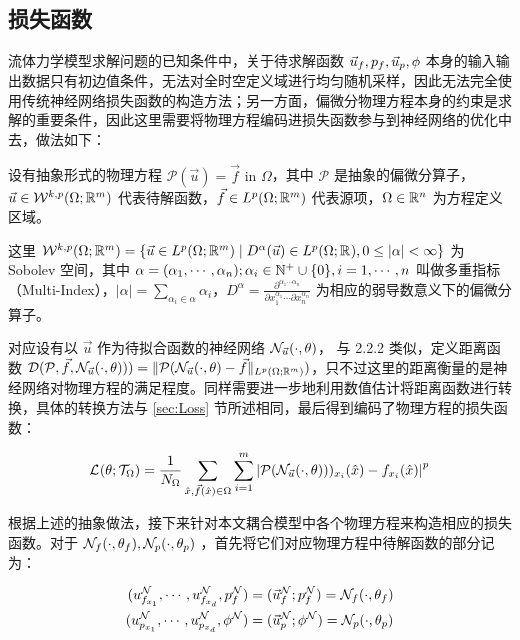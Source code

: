 \subsection{损失函数}

流体力学模型求解问题的已知条件中，关于待求解函数 $\Uf,\pf,\Up,\pp$ 本身的输入输出数据只有初边值条件，无法对全时空定义域进行均匀随机采样，因此无法完全使用传统神经网络损失函数的构造方法；另一方面，偏微分物理方程本身的约束是求解的重要条件，因此这里需要将物理方程编码进损失函数参与到神经网络的优化中去，做法如下：

设有抽象形式的物理方程 $\mathcal{P}(\vec{u}) = \vec{f} \textrm{ in } \Omega$，其中 $\mathcal{P}$ 是抽象的偏微分算子，$\vec{u} \in \Wkp{k}(\Omega; \R[m])$ 代表待解函数，$\vec{f} \in \Lp( \Omega; \R[m])$ 代表源项，$ \Omega \in \R[n]$ 为方程定义区域。

这里 $\Wkp{k}(\Omega; \R[m]) = \left\{ \vec{u} \in \Lp(\Omega;\R[m]) \mid D^\alpha(\vec{u}) \in \Lp(\Omega;\R), 0 \le |\alpha| < \infty \right\}$ 为 Sobolev 空间，其中 $\alpha = (\alpha_1,\cdots,\alpha_n); \alpha_i \in \N[+] \cup \{0\},i=1,\cdots,n$ 叫做多重指标（Multi-Index），$|\alpha| = \sum_{\alpha_i \in \alpha} \alpha_i$，$D^\alpha = \frac{\partial^{\alpha_1\cdots\alpha_n}}{\partial x_1^{\alpha_1}\cdots\partial x_n^{\alpha_n}}$ 为相应的弱导数意义下的偏微分算子。

对应设有以 $\vec{u}$ 作为待拟合函数的神经网络 $\NN_{\vec{u}}(\cdot,\params)$， 与 2.2.2 类似，定义距离函数 $\mathcal{D}(\mathcal{P},\vec{f},\NN_{\vec{u}}(\cdot,\params))) = \| \mathcal{P}(\NN_{\vec{u}}(\cdot,\params) - \vec{f} \|_{L^p(\Omega; \R[m])})$，只不过这里的距离衡量的是神经网络对物理方程的满足程度。同样需要进一步地利用数值估计将距离函数进行转换，具体的转换方法与 \ref{sec:Loss} 节所述相同，最后得到编码了物理方程的损失函数：

\begin{equation}\begin{aligned}
\LossO = \toLoss{\Omega}{\x,\vec{f}(\x)}{m}{
    \mathcal{P}(\NN_{\vec{u}}(\cdot,\params)))_{x_i}(\x)-{f}_{x_i}(\x)
}
\end{aligned}\end{equation}

根据上述的抽象做法，接下来针对本文耦合模型中各个物理方程来构造相应的损失函数。对于 $\NNFf, \NNFp$ ，首先将它们对应物理方程中待解函数的部分记为：

\begin{equation}\label{eq:NNsplit}
    \begin{aligned}
        ( \NUfi[1], \cdots, \NUfi[d], \Npf) &= (\NUf;\Npf) = \NNFf \\
        ( \NUpi[1], \cdots, \NUpi[d], \Npp) &= (\NUp;\Npp) = \NNFp
    \end{aligned}
\end{equation}

